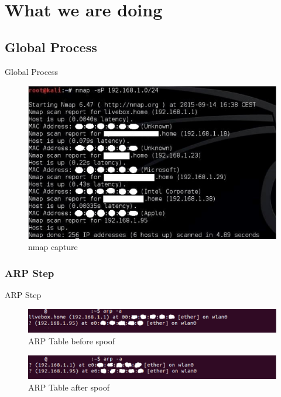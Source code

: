 \documentclass{beamer}
\begin{document}
\section{What we are doing}
\subsection{Global Process}
\begin{frame}{Global Process}
	\begin{figure}[!h]
		\centering
		\includegraphics[scale=0.45]{../images/captureNMAP.eps}
		\caption{nmap capture} %
		\label{nmap_capture} %
	\end{figure}
\end{frame}

\subsubsection{ARP Step}
\begin{frame}{ARP Step}
	\begin{figure}[!h]
		\centering
		\includegraphics[scale=0.50]{../images/arpTableBeforeSpoof.eps}
		\caption{ARP Table before spoof}
		\label{ARP_before_spoof}
	\end{figure}
	\begin{figure}[!h]
		\centering
		\includegraphics[scale=0.50]{../images/arpTableAfterSpoof.eps}
		\caption{ARP Table after spoof}
		\label{ARP_after_spoof}
	\end{figure}	
\end{frame}
\end{document}
